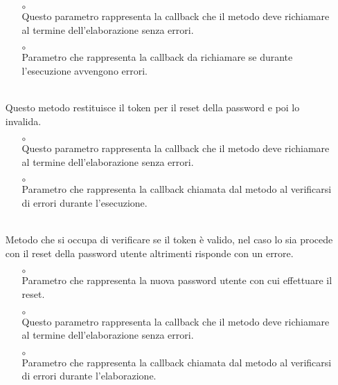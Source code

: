 \begin{itemize}
\begin{itemize}\addtolength{\itemsep}{-0.5\baselineskip}
\item[$\circ$]  \\ Questo parametro rappresenta la callback che il metodo deve richiamare al termine dell'elaborazione senza errori.
\item[$\circ$]  \\ Parametro che rappresenta la callback da richiamare se durante l'esecuzione avvengono errori.
\end{itemize}
\item[]  \\ Questo metodo restituisce il token per il reset della password e poi lo invalida.
\begin{itemize}\addtolength{\itemsep}{-0.5\baselineskip}
\item[$\circ$]  \\ Questo parametro rappresenta la callback che il metodo deve richiamare al termine dell'elaborazione senza errori.
\item[$\circ$]  \\ Parametro che rappresenta la callback chiamata dal metodo al verificarsi di errori durante l'esecuzione.
\end{itemize}
\item[]  \\ Metodo che si occupa di verificare se il token è valido, nel caso lo sia procede con il reset della password utente altrimenti risponde con un errore.
\begin{itemize}\addtolength{\itemsep}{-0.5\baselineskip}
\item[$\circ$]  \\ Parametro che rappresenta la nuova password utente con cui effettuare il reset.
\item[$\circ$]  \\ Questo parametro rappresenta la callback che il metodo deve richiamare al termine dell'elaborazione senza errori.
\item[$\circ$]  \\ Parametro che rappresenta la callback chiamata dal metodo al verificarsi di errori durante l'elaborazione.

\end{itemize}
\end{itemize}
